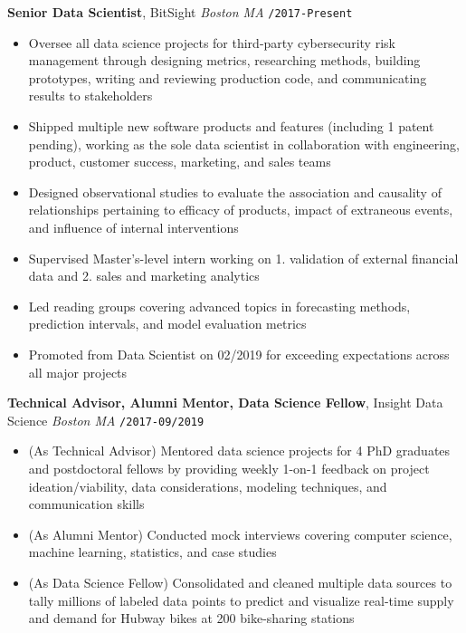 \documentclass[10pt,english]{report}
\begin{document}
\textbf{Senior Data Scientist}, BitSight \hfill \textit{Boston MA} \texttt{/2017-Present}
\begin{itemize}
    \item Oversee all data science projects for third-party cybersecurity risk management through designing metrics, researching methods, building prototypes, writing and reviewing production code, and communicating results to stakeholders
    \item Shipped multiple new software products and features (including 1 patent pending), working as the sole data scientist in collaboration with engineering, product, customer success, marketing, and sales teams
    \item Designed observational studies to evaluate the association and causality of relationships pertaining to efficacy of products, impact of extraneous events, and influence of internal interventions
    \item Supervised Master's-level intern working on 1. validation of external financial data and 2. sales and marketing analytics
    \item Led reading groups covering advanced topics in forecasting methods, prediction intervals, and model evaluation metrics
    \item Promoted from Data Scientist on 02/2019 for exceeding expectations across all major projects
\end{itemize}

\vspace{1mm}

\textbf{Technical Advisor, Alumni Mentor, Data Science Fellow}, Insight Data Science \hfill \textit{Boston MA} \texttt{/2017-09/2019}
\begin{itemize}
    \item (As Technical Advisor) Mentored data science projects for 4 PhD graduates and postdoctoral fellows by providing weekly 1-on-1 feedback on project ideation/viability, data considerations, modeling techniques, and communication skills
    \item (As Alumni Mentor) Conducted mock interviews covering computer science, machine learning, statistics, and case studies
    \item (As Data Science Fellow) Consolidated and cleaned multiple data sources to tally millions of labeled data points to predict and visualize real-time supply and demand for Hubway bikes at 200 bike-sharing stations
\end{itemize}
\end{document}
